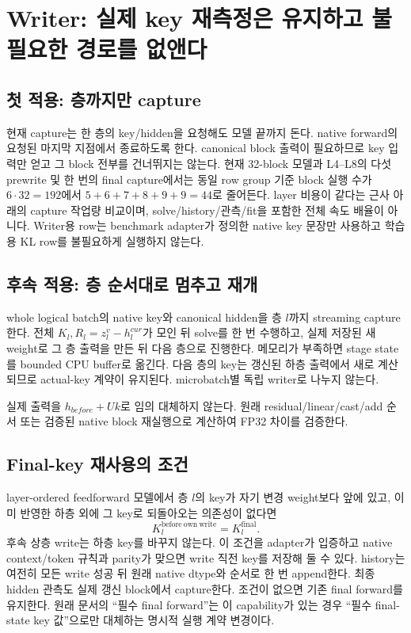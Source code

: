 \documentclass[11pt]{article}
\begin{document}
\section{Writer: 실제 key 재측정은 유지하고 불필요한 경로를 없앤다}
\subsection{첫 적용: 층까지만 capture}
현재 capture는 한 층의 key/hidden을 요청해도 모델 끝까지 돈다. native forward의
요청된 마지막 지점에서 종료하도록 한다. canonical block 출력이 필요하므로
key 입력만 얻고 그 block 전부를 건너뛰지는 않는다.
현재 32-block 모델과 L4--L8의 다섯 prewrite 및 한 번의 final capture에서는
동일 row group 기준 block 실행 수가 $6\cdot32=192$에서
$5+6+7+8+9+9=44$로 줄어든다. layer 비용이 같다는 근사 아래의 capture 작업량 비교이며,
solve/history/관측/fit을 포함한 전체 속도 배율이 아니다.
Writer용 row는 benchmark adapter가 정의한 native key 문장만 사용하고
학습용 KL row를 불필요하게 실행하지 않는다.

\subsection{후속 적용: 층 순서대로 멈추고 재개}
whole logical batch의 native key와 canonical hidden을 층 $l$까지 streaming capture한다.
전체 $K_l,R_l=z_l^v-h_l^{cur}$가 모인 뒤 solve를 한 번 수행하고, 실제 저장된
새 weight로 그 층 출력을 만든 뒤 다음 층으로 진행한다. 메모리가 부족하면
stage state를 bounded CPU buffer로 옮긴다. 다음 층의 key는 갱신된 하층 출력에서
새로 계산되므로 actual-key 계약이 유지된다. microbatch별 독립 writer로 나누지 않는다.

실제 출력을 $h_{before}+U k$로 임의 대체하지 않는다. 원래 residual/linear/cast/add
순서 또는 검증된 native block 재실행으로 계산하여 FP32 차이를 검증한다.

\subsection{Final-key 재사용의 조건}
layer-ordered feedforward 모델에서 층 $l$의 key가 자기 변경 weight보다 앞에 있고,
이미 반영한 하층 외에 그 key로 되돌아오는 의존성이 없다면
\[
 K_l^{\mathrm{before\ own\ write}}=K_l^{\mathrm{final}}.
\]
후속 상층 write는 하층 key를 바꾸지 않는다. 이 조건을 adapter가 입증하고 native
context/token 규칙과 parity가 맞으면 write 직전 key를 저장해 둘 수 있다.
history는 여전히 모든 write 성공 뒤 원래 native dtype와 순서로 한 번 append한다.
최종 hidden 관측도 실제 갱신 block에서 capture한다. 조건이 없으면 기존 final
forward를 유지한다. 원래 문서의 ``필수 final forward''는 이 capability가 있는
경우 ``필수 final-state key 값''으로만 대체하는 명시적 실행 계약 변경이다.
\end{document}
